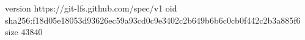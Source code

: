version https://git-lfs.github.com/spec/v1
oid sha256:f18d05e18053d93626ec59a93cd0c9e3402c2b649b6b6c0cb0f442c2b3a885f6
size 43840
